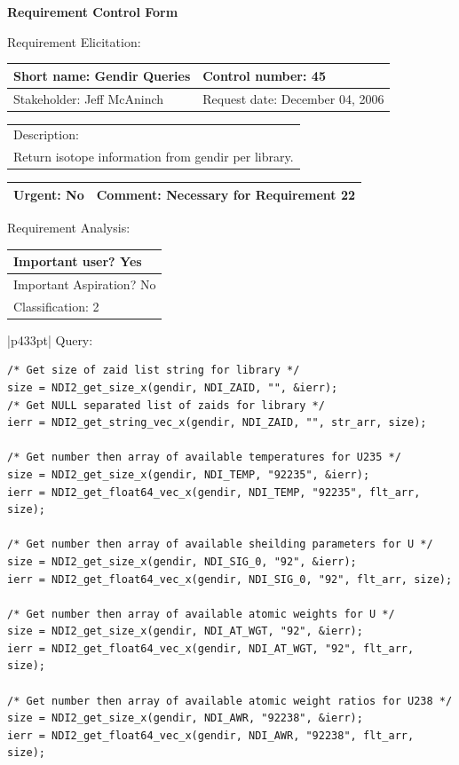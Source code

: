 \begin{center}\Large\bf
Requirement Control Form
\end{center}
\vspace{24pt}

Requirement Elicitation:

\begin{tabular}{|p{211pt}|p{211pt}|} \hline
Short name: Gendir Queries & Control number: 45\\ \hline
Stakeholder: Jeff McAninch & Request date: December 04, 2006\\
\end{tabular}
\begin{tabular}{|p{433pt}|} \hline
Description: \\ 
Return isotope information from gendir per library.\\ 
\hline
\end{tabular} 
\begin{tabular}{|p{211pt}|p{211pt}|} \hline
Urgent: No & Comment: Necessary for Requirement 22\\ \hline
\end{tabular}

\vspace{24pt}

Requirement Analysis:

\begin{tabular}{|p{433pt}|} \hline
Important user? Yes \\ \hline
Important Aspiration? No \\ \hline
Classification: 2 \\ \hline
\end{tabular}

\vspace{12pt}

\begin{tabular}{|p{433pt}|} \hline
Query:
\begin{verbatim}
/* Get size of zaid list string for library */
size = NDI2_get_size_x(gendir, NDI_ZAID, "", &ierr);
/* Get NULL separated list of zaids for library */
ierr = NDI2_get_string_vec_x(gendir, NDI_ZAID, "", str_arr, size);

/* Get number then array of available temperatures for U235 */
size = NDI2_get_size_x(gendir, NDI_TEMP, "92235", &ierr);
ierr = NDI2_get_float64_vec_x(gendir, NDI_TEMP, "92235", flt_arr, size);

/* Get number then array of available sheilding parameters for U */
size = NDI2_get_size_x(gendir, NDI_SIG_0, "92", &ierr);
ierr = NDI2_get_float64_vec_x(gendir, NDI_SIG_0, "92", flt_arr, size);

/* Get number then array of available atomic weights for U */
size = NDI2_get_size_x(gendir, NDI_AT_WGT, "92", &ierr);
ierr = NDI2_get_float64_vec_x(gendir, NDI_AT_WGT, "92", flt_arr, size);

/* Get number then array of available atomic weight ratios for U238 */
size = NDI2_get_size_x(gendir, NDI_AWR, "92238", &ierr);
ierr = NDI2_get_float64_vec_x(gendir, NDI_AWR, "92238", flt_arr, size);
\end{verbatim}
\\ \hline

\end{tabular}

